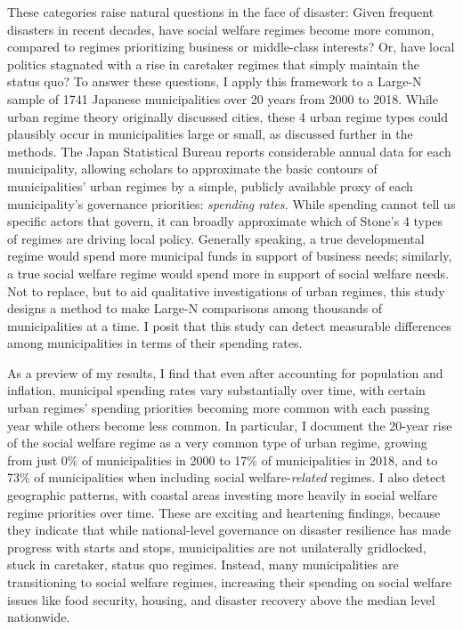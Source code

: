 \documentclass[preprint, 3p,
authoryear]{elsarticle} %
\begin{document}
These categories raise natural questions in the face of disaster: Given
frequent disasters in recent decades, have social welfare regimes become
more common, compared to regimes prioritizing business or middle-class
interests? Or, have local politics stagnated with a rise in caretaker
regimes that simply maintain the status quo? To answer these questions,
I apply this framework to a Large-N sample of 1741 Japanese
municipalities over 20 years from 2000 to 2018. While urban regime
theory originally discussed cities, these 4 urban regime types could
plausibly occur in municipalities large or small, as discussed further
in the methods. The Japan Statistical Bureau reports considerable annual
data for each municipality, allowing scholars to approximate the basic
contours of municipalities' urban regimes by a simple, publicly
available proxy of each municipality's governance priorities:
\emph{spending rates.} While spending cannot tell us specific actors
that govern, it can broadly approximate which of Stone's
\citeyearpar{stone_1993} 4 types of regimes are driving local policy.
Generally speaking, a true developmental regime would spend more
municipal funds in support of business needs; similarly, a true social
welfare regime would spend more in support of social welfare needs. Not
to replace, but to aid qualitative investigations of urban regimes, this
study designs a method to make Large-N comparisons among thousands of
municipalities at a time. I posit that this study can detect measurable
differences among municipalities in terms of their spending rates.

As a preview of my results, I find that even after accounting for
population and inflation, municipal spending rates vary substantially
over time, with certain urban regimes' spending priorities becoming more
common with each passing year while others become less common. In
particular, I document the 20-year rise of the social welfare regime as
a very common type of urban regime, growing from just 0\% of
municipalities in 2000 to 17\% of municipalities in 2018, and to 73\% of
municipalities when including social welfare-\emph{related} regimes. I
also detect geographic patterns, with coastal areas investing more
heavily in social welfare regime priorities over time. These are
exciting and heartening findings, because they indicate that while
national-level governance on disaster resilience has made progress with
starts and stops, municipalities are not unilaterally gridlocked, stuck
in caretaker, status quo regimes. Instead, many municipalities are
transitioning to social welfare regimes, increasing their spending on
social welfare issues like food security, housing, and disaster recovery
above the median level nationwide.
\end{document}
